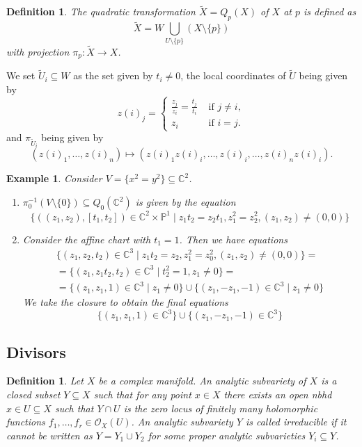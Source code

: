\documentclass[12pt]{article}
\theoremstyle{darkgreentheorem}
\theoremstyle{darkbluedefinition}
\newtheorem{defn}[thm]{Definition}
\theoremstyle{darkredexample}
\newtheorem{exa}[thm]{Example}
\theoremstyle{remark}
\newcommand{\1}{\mathbbm{1}}
\newcommand{\C}{\mathbb{C}}
\renewcommand{\P}{\mathbb{P}}
\renewcommand{\O}{\mathcal{O}}
\newcommand{\tms}{\times}
\newcommand{\sub}{\subseteq}
\begin{document}
\begin{defn}
    The \textit{quadratic transformation} $\tilde{X}=Q_{p}(X)$ of $X$ at $p$ is defined as
    \[ \tilde{X}=W\bigcup_{U\setminus \{p\}}(X\setminus \{p\}) \]
    with projection $\pi_{p}\colon \tilde{X}\to X$.
\end{defn}

We set $\tilde{U}_{i}\sub W$ as the set given by $t_{i}\neq 0$, the local coordinates of $\tilde{U}$ being given by
\[ z(i)_{j}=\begin{cases} \frac{z_{j}}{z_{i}}=\frac{t_{j}}{t_{i}} & \text{ if } j\neq i, \\ z_{i} &\text{ if } i=j.\end{cases} \]
and $\pi_{\tilde{U}_{i}}$ being given by
\[(z(i)_{1},\ldots,z(i)_{n})\mapsto (z(i)_{1}z(i)_{i},\ldots,z(i)_{i},\ldots,z(i)_{n}z(i)_{i}).\]

\begin{exa}
    Consider $V=\{ x^{2}=y^{2}\}\sub \C^{2}$.
    \begin{enumerate}
	\item $\pi_{0}^{-1}(V\setminus \{0\})\sub Q_{0}(\C^{2})$ is given by the equation
	    \[ \{ ((z_{1},z_{2}),[t_{1},t_{2}])\in \C^{2}\tms \P^{1}\mid z_{1}t_{2}=z_{2}t_{1},z_{1}^{2}=z_{2}^{2},(z_{1},z_{2})\neq (0,0)\} \]
	\item Consider the affine chart with $t_{1}=1$.
	    Then we have equations
	    \begin{multline*}
		\{(z_{1},z_{2},t_{2})\in \C^{3}\mid z_{1}t_{2}=z_{2},z_{1}^{2}=z_{0}^{2},(z_{1},z_{2})\neq (0,0) \} =\\  =\{ (z_{1},z_{1}t_{2},t_{2})\in \C^{3}\mid t_{2}^{2}=1,z_{1}\neq 0\} =\\
		=\{ (z_{1},z_{1},1)\in \C^{3}\mid z_{1}\neq 0 \} \cup \{(z_{1},-z_{1},-1)\in \C^{3}\mid z_{1}\neq 0\}
	    \end{multline*}
	    We take the closure to obtain the final equations
	    \[ \{(z_{1},z_{1},1)\in \C^{3}\}\cup \{(z_{1},-z_{1},-1)\in \C^{3}\} \]
    \end{enumerate}
\end{exa}

\subsection{Divisors}

\begin{defn}
    Let $X$ be a complex manifold.
    An \textit{analytic subvariety} of $X$ is a closed subset $Y\sub X$ such that for any point $x\in X$ there exists an open nbhd $x\in U\sub X$ such that $Y\cap U$ is the zero locus of finitely many holomorphic functions $f_{1},\ldots,f_{r}\in \O_{X}(U)$.
    An analytic subvariety $Y$ is called \textit{irreducible} if it cannot be written as $Y=Y_{1}\cup Y_{2}$ for some proper analytic subvarieties $Y_{i}\sub Y$.
\end{defn}
\end{document}
